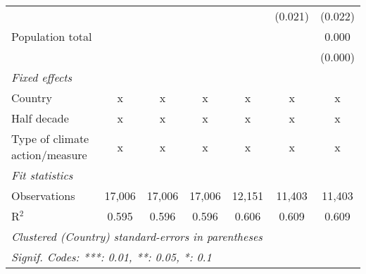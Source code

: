 \begin{tabular}{lcccccc}
                                                                                    &               &                &                &                & (0.021)        & (0.022)\\   
   Population total                                                                 &               &                &                &                &                & 0.000\\   
                                                                                    &               &                &                &                &                & (0.000)\\   
   \emph{Fixed effects}\\
   Country                                                                          & x             & x              & x              & x              & x              & x\\  
   Half decade                                                                      & x             & x              & x              & x              & x              & x\\  
   Type of climate action/measure                                                   & x             & x              & x              & x              & x              & x\\  
   \midrule \emph{Fit statistics}\\
   Observations                                                                     & 17,006        & 17,006         & 17,006         & 12,151         & 11,403         & 11,403\\  
   R$^2$                                                                            & 0.595         & 0.596          & 0.596          & 0.606          & 0.609          & 0.609\\  
   \midrule
   \multicolumn{7}{l}{\emph{Clustered (Country) standard-errors in parentheses}}\\
   \multicolumn{7}{l}{\emph{Signif. Codes: ***: 0.01, **: 0.05, *: 0.1}}\\
\end{tabular}
\par\endgroup


